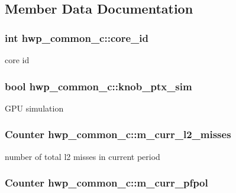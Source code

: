 \subsection{Member Data Documentation}
\hypertarget{classhwp__common__c_afe4085ac88e7260e21e8ef746ad037ea}{
\subsubsection[{core\_\-id}]{\setlength{\rightskip}{0pt plus 5cm}int {\bf hwp\_\-common\_\-c::core\_\-id}}}
\label{classhwp__common__c_afe4085ac88e7260e21e8ef746ad037ea}
core id \hypertarget{classhwp__common__c_a7feb683e634fd5c3687b7373a9765be0}{
\subsubsection[{knob\_\-ptx\_\-sim}]{\setlength{\rightskip}{0pt plus 5cm}bool {\bf hwp\_\-common\_\-c::knob\_\-ptx\_\-sim}}}
\label{classhwp__common__c_a7feb683e634fd5c3687b7373a9765be0}
GPU simulation \hypertarget{classhwp__common__c_a0774007b330ea6bcb63f27e0bb189b66}{
\subsubsection[{m\_\-curr\_\-l2\_\-misses}]{\setlength{\rightskip}{0pt plus 5cm}Counter {\bf hwp\_\-common\_\-c::m\_\-curr\_\-l2\_\-misses}}}
\label{classhwp__common__c_a0774007b330ea6bcb63f27e0bb189b66}
number of total l2 misses in current period \hypertarget{classhwp__common__c_ac018f13a00b71a4d7570403f3c27c732}{
\subsubsection[{m\_\-curr\_\-pfpol}]{\setlength{\rightskip}{0pt plus 5cm}Counter {\bf hwp\_\-common\_\-c::m\_\-curr\_\-pfpol}}}
